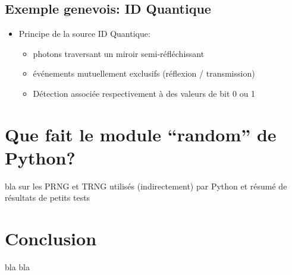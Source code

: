 \documentclass{scrartcl}
\begin{document}
\subsection{Exemple genevois: ID Quantique}
 \begin{itemize}
 \item Principe de la source ID Quantique:
  \begin{itemize}
  \item photons traversant un miroir semi-réfléchissant
  \item événements mutuellement exclusifs (réflexion / transmission)
  \item Détection associée respectivement à des valeurs de bit 0 ou 1
  \end{itemize}
 \end{itemize}

\section{Que fait le module ``random'' de Python?}
bla sur les PRNG et TRNG utilisés (indirectement) par Python et résumé de
résultats de petits tests

\section{Conclusion}
bla bla

\printbibliography
\end{document}

